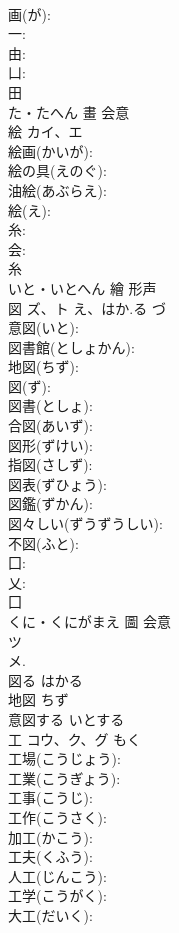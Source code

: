 \documentclass[8pt]{extreport}
\begin{document}
\begin{CJK}{UTF8}{min}
\\	画(が): 
\\	一: 
\\	由: 
\\	凵: 
\\	田	
\\	た・たへん	畫	会意 
\\	絵	カイ、エ			
\\	絵画(かいが): 
\\	絵の具(えのぐ): 
\\	油絵(あぶらえ): 
\\	絵(え): 
\\	糸: 
\\	会: 
\\	糸	
\\	いと・いとへん	繪	形声 
\\	図	ズ、ト	え、はか.る	づ	
\\	意図(いと): 
\\	図書館(としょかん): 
\\	地図(ちず): 
\\	図(ず): 
\\	図書(としょ): 
\\	合図(あいず): 
\\	図形(ずけい): 
\\	指図(さしず): 
\\	図表(ずひょう): 
\\	図鑑(ずかん): 
\\	図々しい(ずうずうしい): 
\\	不図(ふと): 
\\	囗: 
\\	乂: 
\\	囗	
\\	くに・くにがまえ	圖	会意 
\\	ツ 
\\	メ. 
\\	図る はかる 
\\	地図 ちず 
\\	意図する いとする 
\\	工	コウ、ク、グ		もく	
\\	工場(こうじょう): 
\\	工業(こうぎょう): 
\\	工事(こうじ): 
\\	工作(こうさく): 
\\	加工(かこう): 
\\	工夫(くふう): 
\\	人工(じんこう): 
\\	工学(こうがく): 
\\	大工(だいく): 

\end{CJK}
\end{document}

